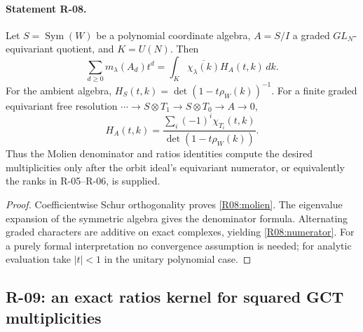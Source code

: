 \documentclass[11pt,a4paper]{article}
\theoremstyle{definition}\newtheorem{definition}{Definition}
\begin{document}
\paragraph{Statement R-08.}
Let $S=\operatorname{Sym}(W)$ be a polynomial coordinate algebra,
$A=S/I$ a graded $GL_N$-equivariant quotient, and $K=U(N)$. Then
\begin{equation}\label{R08:molien}
 \sum_{d\geq0}m_\lambda(A_d)t^d
   =\int_K\overline{\chi_\lambda(k)}H_A(t,k)\,dk.
\end{equation}
For the ambient algebra,
$H_S(t,k)=\det(1-t\rho_W(k))^{-1}$.
For a finite graded equivariant free resolution
$\cdots\to S\otimes T_1\to S\otimes T_0\to A\to0$,
\begin{equation}\label{R08:numerator}
 H_A(t,k)=
 \frac{\sum_i(-1)^i\chi_{T_i}(t,k)}
      {\det(1-t\rho_W(k))}.
\end{equation}
Thus the Molien denominator and ratios identities compute the desired
multiplicities only after the orbit ideal's equivariant numerator,
or equivalently the ranks in R-05--R-06, is supplied.

\begin{proof}
Coefficientwise Schur orthogonality proves \eqref{R08:molien}.
The eigenvalue expansion of the symmetric algebra gives the
denominator formula. Alternating graded characters are additive
on exact complexes, yielding \eqref{R08:numerator}. For a purely
formal interpretation no convergence assumption is needed; for
analytic evaluation take $|t|<1$ in the unitary polynomial case.
\end{proof}

\subsection{R-09: an exact ratios kernel for squared GCT multiplicities}
\end{document}
